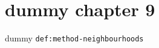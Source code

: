 \clearpage\begingroup\small
\setcounter{chapter}{9}\addtocounter{chapter}{-1}
\chapter{dummy chapter 9}
\begin{definition}\label{def:method-neighbourhoods}dummy \texttt{def:method-neighbourhoods}\end{definition}
\endgroup
